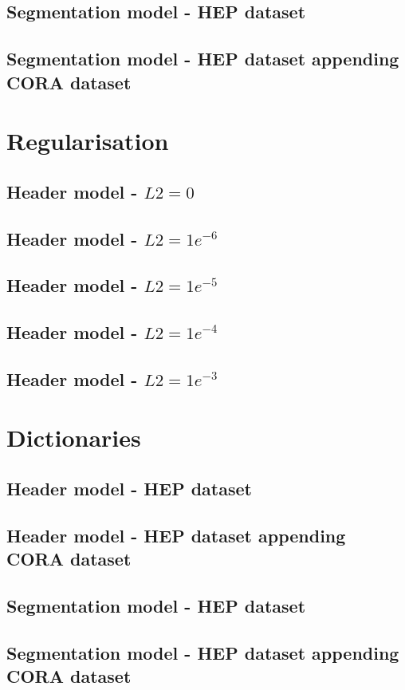 \documentclass[11pt, oneside]{scrartcl}   	%
\begin{document}
\subsection{Segmentation model - HEP dataset}
\subsection{Segmentation model - HEP dataset appending CORA dataset}

\section{Regularisation}
\subsection{Header model - $L2 = 0$}
\subsection{Header model - $L2 = 1e^{-6}$}
\subsection{Header model - $L2 = 1e^{-5}$}
\subsection{Header model - $L2 = 1e^{-4}$}
\subsection{Header model - $L2 = 1e^{-3}$}

\section{Dictionaries}
\subsection{Header model - HEP dataset}
\subsection{Header model - HEP dataset appending CORA dataset}
\subsection{Segmentation model - HEP dataset}
\subsection{Segmentation model - HEP dataset appending CORA dataset}
\end{document}
